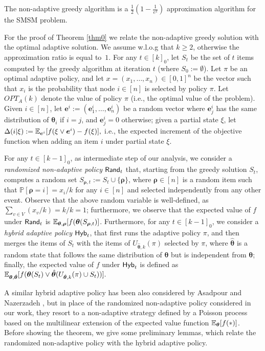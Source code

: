 \begin{theorem}\label{thm0}
The non-adaptive greedy algorithm is a $\frac{1}{2}\left(1-\frac{1}{e^2}\right)$ approximation algorithm for the SMSM problem. 
\end{theorem}
For the proof of Theorem \ref{thm0} we relate the non-adaptive greedy solution with the optimal adaptive solution. We assume w.l.o.g that $k\geq 2$, otherwise the approximation ratio is equal to~$1$. For any $t\in [k]_0$, let $S_t$ be the set of $t$ items computed by the greedy algorithm at iteration $t$ (where $S_0:=\emptyset$). Let $ \pi$ be an optimal adaptive policy, and let $x=(x_1,\ldots, x_n)\in [0,1]^n$ be the vector such that $x_i$ is the probability that node $i\in [n]$ is selected by policy $\pi$. Let $OPT_A(k)$ denote the value of policy $\pi$ (i.e., the optimal value of the problem). Given $i\in [n]$, let $\bm e^{i}:=(\bm e^{i}_1,\ldots, \bm e^{i}_n)$ be a random vector where $\bm e^{i}_j$ has the same distribution of $\bm\theta_i$ if $i=j$, and $\bm e^{i}_j=0$ otherwise; given a partial state $\xi$, let $\Delta(i|\xi):=\mathbb{E}_{\bm e^i}[f(\xi \vee \bm e^{i})-f(\xi)],$ i.e., the expected increment of the objective function when adding an item $i$ under partial state $\xi$.

For any $t\in [k-1]_0$, as intermediate step of our analysis, we consider a {\em randomized non-adaptive policy} ${\sf Rand}_t$ that, starting from the greedy solution $S_{t}$, computes a random set $S_{\bm\rho,t}:=S_{t}\cup\{\bm \rho\}$, where $\bm\rho\in [n]$ is a random item such that $\mathbb{P}[\bm\rho=i]=x_i/k$ for any $i\in [n]$ and selected independently from any other event. Observe that the above random variable is well-defined, as $\sum_{v\in V}(x_v/k)=k/k=1$; furthermore, we observe that the expected value of $f$ under ${\sf Rand}_{t}$ is $\mathbb{E}_{\bm\theta,\bm\rho}[f(\bm \theta(S_{\bm\rho,t})]$. Furthermore, for any $t\in [k-1]_0$, we consider a {\em hybrid adaptive policy} ${\sf Hyb}_{t}$, that first runs the adaptive policy $\pi$, and then merges the items of $S_t$ with the items of $U_{\hat{\bm\theta},k}(\pi)$ selected by $\pi$, where $\hat{\bm \theta}$ is a random state that follows the same distribution of $\bm \theta$ but is  independent from $\bm \theta$; finally, the expected value of $f$ under ${\sf Hyb}_{t}$ is defined as $\mathbb{E}_{\bm\theta,\hat{\bm \theta}}[f(\bm\theta(S_t)\vee\hat{\bm \theta}(U_{\hat{\bm\theta},k}(\pi)\cup S_t))].$

A similar hybrid adaptive policy has been also considered by Asadpour and Nazerzadeh \cite{Asadpour16}, but in place of the randomized non-adaptive policy considered in our work, they resort to a non-adaptive strategy defined by a Poisson process based on the multilinear extension of the expected value function $\mathbb{E}_{\bm \theta}[f(*)]$. Before showing the theorem, we give some preliminary lemmas, which relate the randomized non-adaptive policy with the hybrid adaptive policy.

